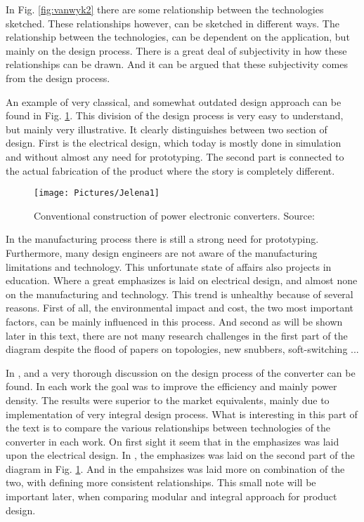 \documentclass[]{scrartcl}
\begin{document}
In Fig. \ref{fig:vanwyk2} there are some relationship between the technologies sketched. These relationships however, can be sketched in different ways. The relationship between the technologies, can be dependent on the application, but mainly on the design process. There is a great deal of subjectivity in how these relationships can be drawn. And it can be argued that these subjectivity comes from the design process. 

An example of very classical, and somewhat outdated design approach can be found in Fig. \ref{fig:jelena2}. This division of the design process is very easy to understand, but mainly very illustrative. It clearly distinguishes between two section of design. First is the electrical design, which today is mostly done in simulation and without almost any need for prototyping. The second part is  connected to the actual fabrication of the product where the story is completely different.

\begin{figure}[h!]
	\centering
	\texttt{[image: Pictures/Jelena1]}
	\caption{Conventional construction of power electronic converters. Source:\cite{Popovic2005}}
	\label{fig:jelena2}
\end{figure}

In the manufacturing process there is still a strong need for prototyping. Furthermore, many design engineers are not aware of the manufacturing limitations and technology. This unfortunate state of affairs also projects in education. Where a great emphasizes is laid on electrical design, and almost none on the manufacturing and technology. This trend is unhealthy because of several reasons. First of all, the environmental impact and cost, the two most important factors, can be mainly influenced in this process. And second as will be shown later in this text, there are not many research challenges in the first part of the diagram despite the flood of papers on topologies, new snubbers, soft-switching ... 

In \cite{Pavlovsky2006},\cite{Popovic2005} and \cite{Gerber2005} a very thorough discussion on the design process of the converter can be found. In each work the goal was to improve the efficiency and mainly power density. The results were superior to the market equivalents, mainly due to implementation of very integral design process. What is interesting in this part of the text is to compare the various relationships between technologies of the converter in each work. On first sight it seem that in \cite{Pavlovsky2006} the emphasizes was laid upon the electrical design. In \cite{Popovic2005}, the emphasizes was laid on the second part of the diagram in Fig. \ref{fig:jelena2}. And in \cite{Gerber2005} the empahsizes was laid more on combination of the two, with defining more consistent relationships.  This small note will be important later, when comparing modular and integral approach for product design.
\end{document}
